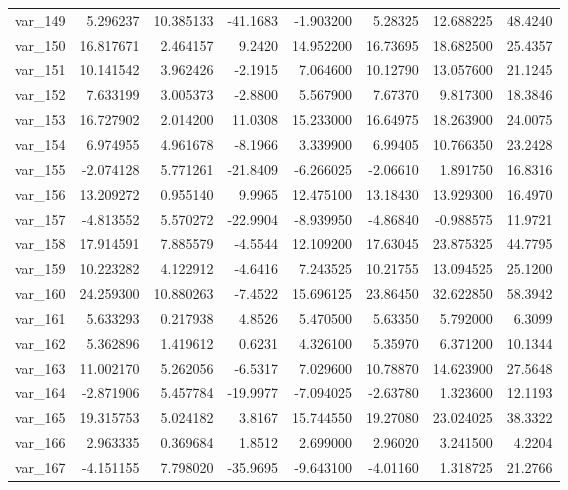 ﻿\documentclass[12pt]{article}
\begin{document}
\begin{longtable}{lrrrrrrr}
 var\_149 &   5.296237 &  10.385133 & -41.1683 &  -1.903200 &   5.28325 &  12.688225 &  48.4240 \\
 var\_150 &  16.817671 &   2.464157 &   9.2420 &  14.952200 &  16.73695 &  18.682500 &  25.4357 \\
 var\_151 &  10.141542 &   3.962426 &  -2.1915 &   7.064600 &  10.12790 &  13.057600 &  21.1245 \\
 var\_152 &   7.633199 &   3.005373 &  -2.8800 &   5.567900 &   7.67370 &   9.817300 &  18.3846 \\
 var\_153 &  16.727902 &   2.014200 &  11.0308 &  15.233000 &  16.64975 &  18.263900 &  24.0075 \\
 var\_154 &   6.974955 &   4.961678 &  -8.1966 &   3.339900 &   6.99405 &  10.766350 &  23.2428 \\
 var\_155 &  -2.074128 &   5.771261 & -21.8409 &  -6.266025 &  -2.06610 &   1.891750 &  16.8316 \\
 var\_156 &  13.209272 &   0.955140 &   9.9965 &  12.475100 &  13.18430 &  13.929300 &  16.4970 \\
 var\_157 &  -4.813552 &   5.570272 & -22.9904 &  -8.939950 &  -4.86840 &  -0.988575 &  11.9721 \\
 var\_158 &  17.914591 &   7.885579 &  -4.5544 &  12.109200 &  17.63045 &  23.875325 &  44.7795 \\
 var\_159 &  10.223282 &   4.122912 &  -4.6416 &   7.243525 &  10.21755 &  13.094525 &  25.1200 \\
 var\_160 &  24.259300 &  10.880263 &  -7.4522 &  15.696125 &  23.86450 &  32.622850 &  58.3942 \\
 var\_161 &   5.633293 &   0.217938 &   4.8526 &   5.470500 &   5.63350 &   5.792000 &   6.3099 \\
 var\_162 &   5.362896 &   1.419612 &   0.6231 &   4.326100 &   5.35970 &   6.371200 &  10.1344 \\
 var\_163 &  11.002170 &   5.262056 &  -6.5317 &   7.029600 &  10.78870 &  14.623900 &  27.5648 \\
 var\_164 &  -2.871906 &   5.457784 & -19.9977 &  -7.094025 &  -2.63780 &   1.323600 &  12.1193 \\
 var\_165 &  19.315753 &   5.024182 &   3.8167 &  15.744550 &  19.27080 &  23.024025 &  38.3322 \\
 var\_166 &   2.963335 &   0.369684 &   1.8512 &   2.699000 &   2.96020 &   3.241500 &   4.2204 \\
 var\_167 &  -4.151155 &   7.798020 & -35.9695 &  -9.643100 &  -4.01160 &   1.318725 &  21.2766 \\

\end{longtable}
\end{document}
